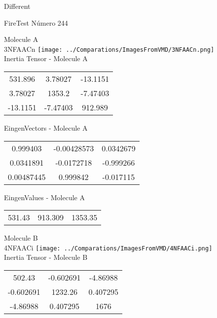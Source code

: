\begin{center}
\vtab
\vtab
\textcolor{NavyBlue}{\Large Different}
\end{center}

 \newpage

\vtab[-2cm]
\begin{center}
{\large FireTest \tab Número 244}
\end{center}
\begin{multicols}{2}
\begin{center}

Molecule A \\ 
3NFAACn
\texttt{[image: ../Comparations/ImagesFromVMD/3NFAACn.png]}
\\
Inertia Tensor - Molecule A \\
\vtab

\begin{tabular}{|c c c|}
531.896	 & 	3.78027	 & 	-13.1151	 \\
3.78027	 & 	1353.2	 & 	-7.47403	 \\
-13.1151	 & 	-7.47403	 & 	912.989
\end{tabular}

\vtab
 EingenVectors - Molecule A     \\
\vtab
\begin{tabular}{|c c c|}
0.999403	 & 	-0.00428573	 & 	0.0342679	 \\
0.0341891	 & 	-0.0172718	 & 	-0.999266	 \\
0.00487445	 & 	0.999842	 & 	-0.017115
\end{tabular}

\vtab
 EingenValues - Molecule A     \\
\vtab
\begin{tabular}{|c c c|}
531.43	 & 	913.309	 & 	1353.35	 \\
\end{tabular}
\columnbreak

Molecule B \\ 
4NFAACi
\texttt{[image: ../Comparations/ImagesFromVMD/4NFAACi.png]}
\\
Inertia Tensor - Molecule B \\
\vtab

\begin{tabular}{|c c c|}
502.43	 & 	-0.602691	 & 	-4.86988	 \\
-0.602691	 & 	1232.26	 & 	0.407295	 \\
-4.86988	 & 	0.407295	 & 	1676
\end{tabular}


\end{center}
\end{multicols}
